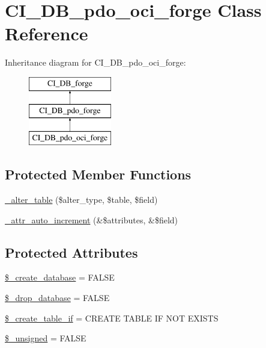 \hypertarget{class_c_i___d_b__pdo__oci__forge}{}\section{C\+I\+\_\+\+D\+B\+\_\+pdo\+\_\+oci\+\_\+forge Class Reference}
\label{class_c_i___d_b__pdo__oci__forge}
Inheritance diagram for C\+I\+\_\+\+D\+B\+\_\+pdo\+\_\+oci\+\_\+forge\+:\begin{figure}[H]
\begin{center}
\leavevmode
\includegraphics[height=3.000000cm]{class_c_i___d_b__pdo__oci__forge}
\end{center}
\end{figure}
\subsection*{Protected Member Functions}
\begin{DoxyCompactItemize}
\item 
\hyperlink{class_c_i___d_b__pdo__oci__forge_a41c6cae02f2fda8b429ad0afb9509426}{\+\_\+alter\+\_\+table} (\$alter\+\_\+type, \$table, \$field)
\item 
\hyperlink{class_c_i___d_b__pdo__oci__forge_a2a013a5932439c3c44f0dad3436525f7}{\+\_\+attr\+\_\+auto\+\_\+increment} (\&\$attributes, \&\$field)
\end{DoxyCompactItemize}
\subsection*{Protected Attributes}
\begin{DoxyCompactItemize}
\item 
\hyperlink{class_c_i___d_b__pdo__oci__forge_acd23c9a8735806155f1a5d0a87c151f2}{\$\+\_\+create\+\_\+database} = F\+A\+L\+S\+E
\item 
\hyperlink{class_c_i___d_b__pdo__oci__forge_a8305b12fc17f6f87778260ebdff287b4}{\$\+\_\+drop\+\_\+database} = F\+A\+L\+S\+E
\item 
\hyperlink{class_c_i___d_b__pdo__oci__forge_a2f6484fcb8d1dc3eef67a637227cd583}{\$\+\_\+create\+\_\+table\+\_\+if} = \textquotesingle{}C\+R\+E\+A\+T\+E T\+A\+B\+L\+E I\+F N\+O\+T E\+X\+I\+S\+T\+S\textquotesingle{}
\item 
\hyperlink{class_c_i___d_b__pdo__oci__forge_aae977ae6d61fa183f0b25422b6ddc31c}{\$\+\_\+unsigned} = F\+A\+L\+S\+E
\end{DoxyCompactItemize}
